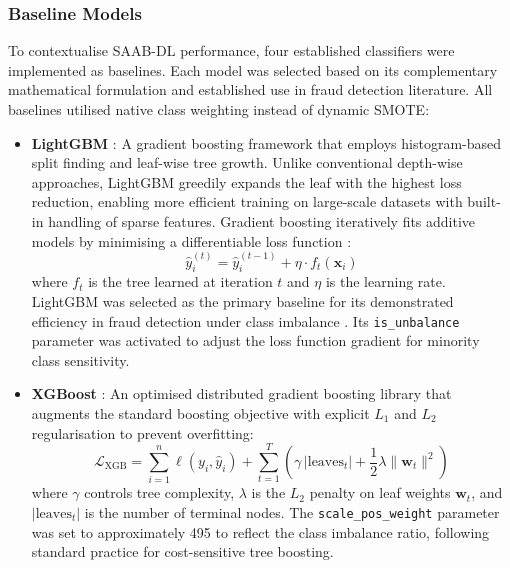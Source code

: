 \documentclass[a4paper,fleqn]{cas-sc}
\begin{document}
\subsubsection{Baseline Models}
To contextualise SAAB-DL performance, four established classifiers were implemented as baselines. Each model was selected based on its complementary mathematical formulation and established use in fraud detection literature. All baselines utilised native class weighting instead of dynamic SMOTE:

\begin{itemize}
    \item \textbf{LightGBM} \cite{Ke2017LightGBM}: A gradient boosting framework that employs histogram-based split finding and leaf-wise tree growth. Unlike conventional depth-wise approaches, LightGBM greedily expands the leaf with the highest loss reduction, enabling more efficient training on large-scale datasets with built-in handling of sparse features. Gradient boosting iteratively fits additive models by minimising a differentiable loss function \cite{Friedman2001GBM}:
    \begin{equation}
    \hat{y}_i^{(t)} = \hat{y}_i^{(t-1)} + \eta \cdot f_t(\mathbf{x}_i)
    \label{eq:gbm}
    \end{equation}
    where $f_t$ is the tree learned at iteration $t$ and $\eta$ is the learning rate. LightGBM was selected as the primary baseline for its demonstrated efficiency in fraud detection under class imbalance \cite{Zhao2024Improved}. Its \texttt{is\_unbalance} parameter was activated to adjust the loss function gradient for minority class sensitivity.

    \item \textbf{XGBoost} \cite{Chen2016XGBoost}: An optimised distributed gradient boosting library that augments the standard boosting objective with explicit $L_1$ and $L_2$ regularisation to prevent overfitting:
    \begin{equation}
    \mathcal{L}_{\text{XGB}} = \sum_{i=1}^{n} \ell(y_i, \hat{y}_i) + \sum_{t=1}^{T}\left(\gamma\, |\text{leaves}_t| + \frac{1}{2}\lambda\|\mathbf{w}_t\|^2\right)
    \label{eq:xgb}
    \end{equation}
    where $\gamma$ controls tree complexity, $\lambda$ is the $L_2$ penalty on leaf weights $\mathbf{w}_t$, and $|\text{leaves}_t|$ is the number of terminal nodes. The \texttt{scale\_pos\_weight} parameter was set to approximately 495 to reflect the class imbalance ratio, following standard practice for cost-sensitive tree boosting.


\end{itemize}
\end{document}
